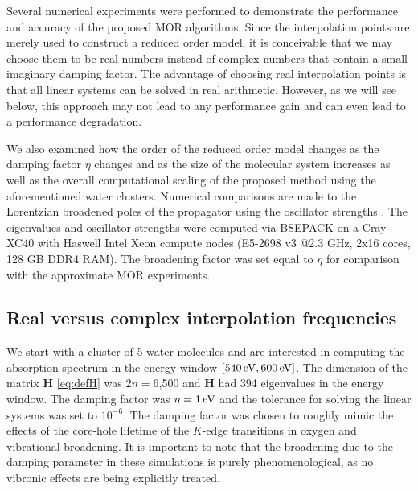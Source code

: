 Several numerical experiments were performed to demonstrate the performance and accuracy of the proposed MOR algorithms. Since the interpolation points are merely used to construct a reduced order model, it is conceivable that we may choose them to be real numbers instead of complex numbers that contain a small imaginary damping factor.  The advantage of choosing real interpolation points is that all linear systems can be solved in real arithmetic. However, as we will see below, this approach may not lead to any performance gain and can even lead to a performance degradation.

We also examined how the order of the reduced order model changes as the damping factor $\eta$ changes and as the size of the molecular system increases as well as the overall computational scaling of the proposed method using the aforementioned water clusters. Numerical comparisons are made to the Lorentzian broadened poles of the propagator using the oscillator strengths \cite{Ball64_844,Harris69_3947,McKoy75_1168}. The eigenvalues and oscillator strengths were computed via BSEPACK\cite{bsepack,SJYDL2016} on a Cray XC40 with Haswell Intel Xeon compute nodes (E5-2698 v3 @2.3 GHz, 2x16 cores, 128 GB DDR4 RAM). The broadening factor was set equal to $\eta$ for comparison with the approximate MOR experiments.

\subsection{Real versus complex interpolation frequencies}
\label{sec:MORresults-points}

We start with a cluster of 5 water molecules and are interested in computing
the absorption spectrum in the energy window $[540\,\mathrm{eV},600\,\mathrm{eV}]$. The
dimension of the matrix $\mathbf{H}$ \cref{eq:defH} was $2n = 6$,500 and $\mathbf{H}$ had
394 eigenvalues in the energy window. The damping factor was $\eta = 1\,\mathrm{eV}$
and the tolerance for solving the linear systems was set to $10^{-6}$. The
damping factor was chosen to roughly mimic the effects of the core-hole
lifetime of the $K$-edge transitions in oxygen and vibrational
broadening\cite{Stohr_book}. It is important to note that the broadening due to
the damping parameter in these simulations is purely phenomenological, as no
vibronic effects are being explicitly treated.

